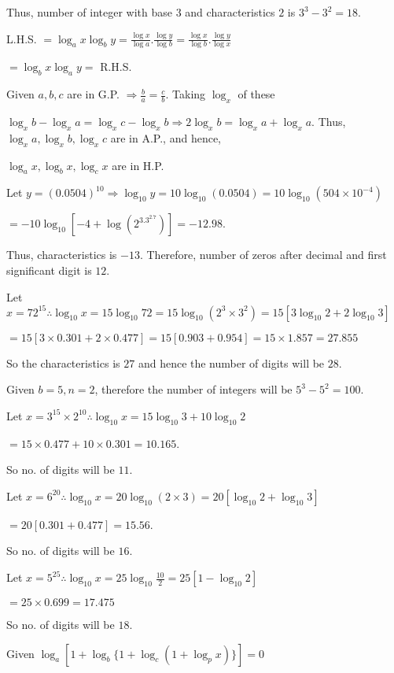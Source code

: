   Thus, number of integer with base $3$ and characteristics $2$ is $3^3 - 3^2 = 18$.
\item L.H.S. $=\log_ax\log_by = \frac{\log x}{\log a}.\frac{\log y}{\log b} = \frac{\log x}{\log b}.\frac{\log y}{\log x}$

  $= \log_bx\log_ay =$ R.H.S.
\item Given $a, b, c$ are in G.P. $\Rightarrow \frac{b}{a} = \frac{c}{b}$. Taking $\log_x$ of these

  $\log_xb - \log_xa = \log_xc - \log_xb \Rightarrow 2\log_xb = \log_xa + \log_xa$. Thus, $\log_xa, \log_xb, \log_xc$
  are in A.P., and hence,

  $\log_ax, \log_bx, \log_cx$ are in H.P.
\item Let $y = (0.0504)^{10} \Rightarrow \log_{10}y = 10\log_{10}(0.0504) = 10\log_{10}(504\times10^{-4})$

  $= -10\log_{10}[-4 + \log(2^3.3^2.7)] = -12.98$.

  Thus, characteristics is $-13$. Therefore, number of zeros after decimal and first significant digit is $12$.
\item Let $x = 72^{15} \therefore \log_{10}x = 15\log_{10}72 = 15\log_{10}(2^3\times3^2) = 15[3\log_{10}2 + 2\log_{10}3]$

  $= 15[3\times0.301 + 2\times0.477] = 15[0.903 + 0.954] = 15\times1.857 = 27.855$

  So the characteristics is $27$ and hence the number of digits will be $28$.
\item Given $b = 5, n = 2$, therefore the number of integers will be $5^3 - 5^2 = 100$.
\item Let $x = 3^{15}\times 2^{10} \therefore \log_{10}x = 15\log_{10}3 + 10\log_{10}2$

  $= 15\times0.477 + 10\times 0.301 = 10.165$.

  So no. of digits will be $11$.
\item Let $x = 6^{20} \therefore \log_{10}x = 20\log_{10}(2\times3) = 20[\log_{10}2 + \log_{10}3]$

  $= 20[0.301 + 0.477] = 15.56$.

  So no. of digits will be $16$.
\item Let $x = 5^{25} \therefore \log_{10}x = 25\log_{10}\frac{10}{2}= 25[1 - \log_{10}2]$

  $= 25\times 0.699 = 17.475$

  So no. of digits will be $18$.
\item Given $\log_a[1 + \log_b\{1 + \log_c(1 + \log_px)\}] = 0$

